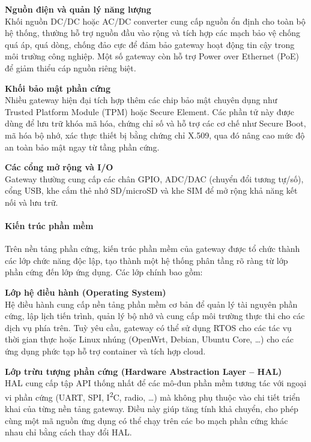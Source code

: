                     \textbf{Nguồn điện và quản lý năng lượng} \\
                        Khối nguồn DC/DC hoặc AC/DC converter cung cấp nguồn ổn định cho toàn bộ hệ thống, thường hỗ trợ nguồn đầu vào rộng và tích hợp các mạch bảo vệ chống quá áp, quá dòng, chống đảo cực để đảm bảo gateway hoạt động tin cậy trong môi trường công nghiệp. Một số gateway còn hỗ trợ Power over Ethernet (PoE) để giảm thiểu cáp nguồn riêng biệt.

                    \textbf{Khối bảo mật phần cứng}\\
                        Nhiều gateway hiện đại tích hợp thêm các chip bảo mật chuyên dụng như Trusted Platform Module (TPM) hoặc Secure Element. Các phần tử này được dùng để lưu trữ khóa mã hóa, chứng chỉ số và hỗ trợ các cơ chế như Secure Boot, mã hóa bộ nhớ, xác thực thiết bị bằng chứng chỉ X.509, qua đó nâng cao mức độ an toàn bảo mật ngay từ tầng phần cứng.

                    \textbf{Các cổng mở rộng và I/O}\\
                        Gateway thường cung cấp các chân GPIO, ADC/DAC (chuyển đổi tương tự/số), cổng USB, khe cắm thẻ nhớ SD/microSD và khe SIM để mở rộng khả năng kết nối và lưu trữ.

                \paragraph{Kiến trúc phần mềm}
                    Trên nền tảng phần cứng, kiến trúc phần mềm của gateway được tổ chức thành các lớp chức năng độc lập, tạo thành một hệ thống phân tầng rõ ràng từ lớp phần cứng đến lớp ứng dụng. Các lớp chính bao gồm:

                    \textbf{Lớp hệ điều hành (Operating System)}\\
                        Hệ điều hành cung cấp nền tảng phần mềm cơ bản để quản lý tài nguyên phần cứng, lập lịch tiến trình, quản lý bộ nhớ và cung cấp môi trường thực thi cho các dịch vụ phía trên. Tuỳ yêu cầu, gateway có thể sử dụng RTOS cho các tác vụ thời gian thực hoặc Linux nhúng (OpenWrt, Debian, Ubuntu Core, \dots) cho các ứng dụng phức tạp hỗ trợ container và tích hợp cloud.
                    
                    \textbf{Lớp trừu tượng phần cứng (Hardware Abstraction Layer -- HAL)}\\
                        HAL cung cấp tập API thống nhất để các mô-đun phần mềm tương tác với ngoại vi phần cứng (UART, SPI, I\textsuperscript{2}C, radio, \dots) mà không phụ thuộc vào chi tiết triển khai của từng nền tảng gateway. Điều này giúp tăng tính khả chuyển, cho phép cùng một mã nguồn ứng dụng có thể chạy trên các bo mạch phần cứng khác nhau chỉ bằng cách thay đổi HAL.
                    
